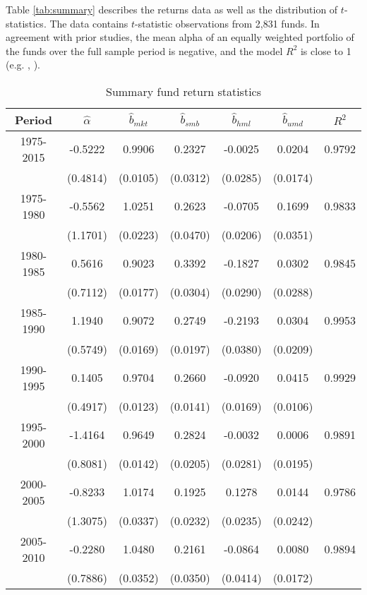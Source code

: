 Table \ref{tab:summary} describes the returns data as well as the distribution of $t$-statistics.  The data contains $t$-statistic observations from 2,831 funds.  In agreement with prior studies, the mean alpha of an equally weighted portfolio of the funds over the full sample period is negative, and the model $R^2$ is close to 1 (e.g. \citet{Barras2010}, \citet{Carhart1997}).

\begin{table}[ht!]
\small
\centering
\captionsetup{labelsep=colon, font=footnotesize, justification=centerfirst}
\caption{Summary fund return statistics}
\begin{tabular}{*{7}{c}}
\toprule
Period & $\hat{\alpha}$ & $\hat{b}_{mkt}$ & $\hat{b}_{smb}$ & $\hat{b}_{hml}$ & $\hat{b}_{umd}$ & $R^2$ \\
\midrule
1975-2015 	& -0.5222 & 0.9906 & 0.2327 & -0.0025 &  0.0204 & 0.9792 \\
			&  (0.4814) & (0.0105) & (0.0312) &  (0.0285) &  (0.0174) & \\
1975-1980 	& -0.5562 & 1.0251 & 0.2623 & -0.0705 &  0.1699 & 0.9833 \\
        	&  (1.1701) & (0.0223) & (0.0470) &  (0.0206) &  (0.0351) & \\
1980-1985 	&  0.5616 & 0.9023 & 0.3392 & -0.1827 &  0.0302 & 0.9845 \\
        	&  (0.7112) & (0.0177) & (0.0304) &  (0.0290) &  (0.0288) & \\
1985-1990 	&  1.1940 & 0.9072 & 0.2749 & -0.2193 &  0.0304 & 0.9953 \\
        	&  (0.5749) & (0.0169) & (0.0197) &  (0.0380) &  (0.0209) & \\
1990-1995 	&  0.1405 & 0.9704 & 0.2660 & -0.0920 &  0.0415 & 0.9929 \\
        	&  (0.4917) & (0.0123) & (0.0141) &  (0.0169) &  (0.0106) & \\
1995-2000 	& -1.4164 & 0.9649 & 0.2824 & -0.0032 &  0.0006 & 0.9891 \\
        	&  (0.8081) & (0.0142) & (0.0205) &  (0.0281) &  (0.0195) & \\
2000-2005 	& -0.8233 & 1.0174 & 0.1925 &  0.1278 &  0.0144 & 0.9786 \\
        	&  (1.3075) & (0.0337) & (0.0232) &  (0.0235) &  (0.0242) & \\
2005-2010 	& -0.2280 & 1.0480 & 0.2161 & -0.0864 &  0.0080 & 0.9894 \\
        	&  (0.7886) & (0.0352) & (0.0350) &  (0.0414) &  (0.0172) & \\

\end{tabular}
\end{table}

